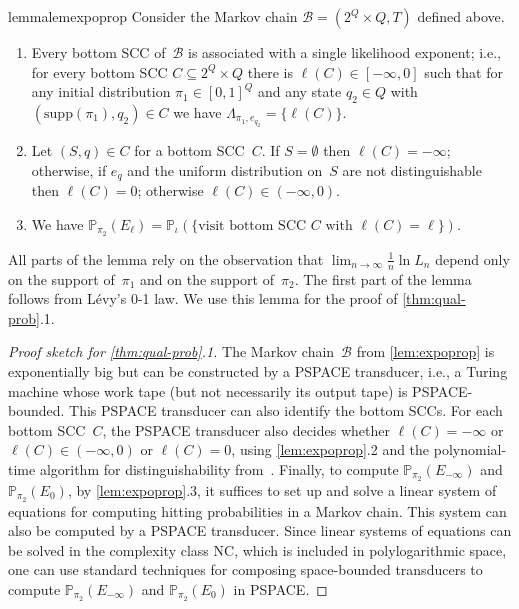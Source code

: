 \documentclass[a4paper,UKenglish,cleveref, autoref,mathscr]{lipics-v2019}
\newcommand{\PP}{\mathbb{P}}
\newcommand{\1}{\mathbbm{1}}
\newcommand{\supp}{\mathrm{supp}}
\newcommand{\liexp}{\lim_{n\rightarrow\infty} \frac1n \ln L_n}
\newcommand{\B}{\mathcal{B}}
\begin{document}
\begin{restatable}{lemma}{lemexpoprop} \label{lem:expoprop}
Consider the Markov chain $\B = (2^Q \times Q, T)$ defined above.
\begin{enumerate}
\item
Every bottom SCC of~$\B$ is associated with a single likelihood exponent; i.e., for every bottom SCC $C \subseteq 2^Q \times Q$ there is $\ell(C) \in [-\infty,0]$ such that for any initial distribution $\pi_1 \in [0,1]^Q$ and any state $q_2 \in Q$ with $(\supp(\pi_1),q_2) \in C$ we have $\Lambda_{\pi_1,e_{q_2}} = \{\ell(C)\}$.
\item
Let $(S,q) \in C$ for a bottom SCC~$C$.
If $S = \emptyset$ then $\ell(C) = -\infty$; otherwise, if $e_q$ and the uniform distribution on~$S$ are not distinguishable then $\ell(C) = 0$; otherwise $\ell(C) \in (-\infty,0)$.
\item
We have $\PP_{\pi_2}(E_\ell) = \PP_{\iota}(\{\text{visit bottom SCC $C$ with $\ell(C) = \ell$}\})$.
\end{enumerate}
\end{restatable}

All parts of the lemma rely on the observation that $\liexp$ depend only on the support of~$\pi_1$ and on the support of~$\pi_2$.
The first part of the lemma follows from L\'evy's 0-1 law.
We use this lemma for the proof of \cref{thm:qual-prob}.1.
\begin{proof}[Proof sketch for \cref{thm:qual-prob}.1]
The Markov chain~$\B$ from \cref{lem:expoprop} is exponentially big but can be constructed by a PSPACE transducer, i.e., a Turing machine whose work tape (but not necessarily its output tape) is PSPACE-bounded.
This PSPACE transducer can also identify the bottom SCCs.
For each bottom SCC~$C$, the PSPACE transducer also decides whether $\ell(C) = -\infty$ or $\ell(C) \in (-\infty,0)$ or $\ell(C) = 0$, using \cref{lem:expoprop}.2 and the polynomial-time algorithm for distinguishability from~\cite{kief14}.
Finally, to compute $\PP_{\pi_2}(E_{-\infty})$ and $\PP_{\pi_2}(E_0)$, by \cref{lem:expoprop}.3, it suffices to set up and solve a linear system of equations for computing hitting probabilities in a Markov chain.
This system can also be computed by a PSPACE transducer.
Since linear systems of equations can be solved in the complexity class NC, which is included in polylogarithmic space, one can use standard techniques for composing space-bounded transducers to compute $\PP_{\pi_2}(E_{-\infty})$ and $\PP_{\pi_2}(E_0)$ in PSPACE.
\end{proof}
\end{document}
